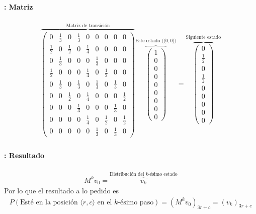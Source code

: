 \documentclass[../main.tex]{subfiles}
\begin{document}
\begin{frame}
  \frametitle{\SECTIONC}
  \framesubtitle{\EJC: Matriz}

  \begin{gather*}
    \overbrace{\begin{pmatrix}
        0 & \frac{1}{3} & 0 & \frac{1}{3} & 0 & 0 & 0 & 0 & 0  \\
        \frac{1}{2} & 0 & \frac{1}{2} & 0 & \frac{1}{4} & 0 & 0 & 0 & 0  \\
        0 & \frac{1}{3} & 0 & 0 & 0 & \frac{1}{3} & 0 & 0 & 0  \\
        \frac{1}{2} & 0 & 0 & 0 & \frac{1}{4} & 0 & \frac{1}{2} & 0 & 0  \\
        0 & \frac{1}{3} & 0 & \frac{1}{3} & 0 & \frac{1}{3} & 0 & \frac{1}{3} & 0  \\
        0 & 0 & \frac{1}{2} & 0 & \frac{1}{4} & 0 & 0 & 0 & \frac{1}{2} \\
        0 & 0 & 0 & \frac{1}{3} & 0 & 0 & 0 & \frac{1}{3} & 0  \\
        0 & 0 & 0 & 0 & \frac{1}{4} & 0 & \frac{1}{2} & 0 & \frac{1}{2} \\
        0 & 0 & 0 & 0 & 0 & \frac{1}{3} & 0 & \frac{1}{3} & 0
    \end{pmatrix}}^{\text{Matriz de transición}}
    \overbrace{\begin{pmatrix}
      1 \\ 0 \\ 0 \\ 0 \\ 0 \\ 0 \\ 0 \\ 0 \\ 0 
    \end{pmatrix}}^{\text{Este estado (\(\langle 0, 0 \rangle\))}}
    =
    \overbrace{\begin{pmatrix}
      0 \\ \frac{1}{2} \\ 0 \\ \frac{1}{2} \\ 0 \\ 0 \\ 0 \\ 0 \\ 0 
    \end{pmatrix}}^{\text{Siguiente estado}}
  \end{gather*}
\end{frame}

\begin{frame}
  \frametitle{\SECTIONC}
  \framesubtitle{\EJC: Resultado}

  \begin{gather*}
    M^{k} v_{0} = \overbrace{v_{k}}^{\text{Distribución del \(k\)-ésimo estado}}
  \end{gather*} \pause
  Por lo que el resultado a lo pedido es
  \begin{gather*}
    P(\text{Esté en la posición } \langle r, c \rangle \text{ en el \(k\)-ésimo paso}) = (M^{k}v_{0})_{3r + c} = (v_{k})_{3r + c}
  \end{gather*}
\end{frame}

\end{document}
